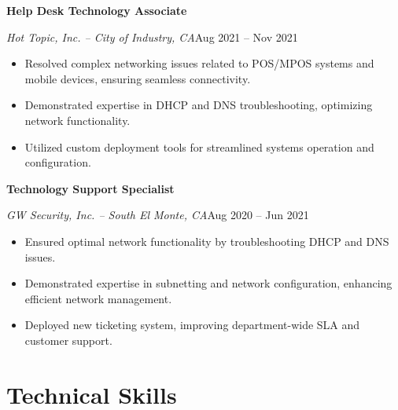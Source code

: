 \documentclass[a4paper]{article}
\begin{document}
\begin{minipage}[t]{0.62\textwidth}
    \vspace{0.5em}
    \textbf{Help Desk Technology Associate}\par
    \textit{Hot Topic, Inc. -- City of Industry, CA}\hfill Aug 2021 -- Nov 2021
    \begin{itemize}[noitemsep,nolistsep]
        \item Resolved complex networking issues related to POS/MPOS systems and mobile devices, ensuring seamless connectivity.
        \item Demonstrated expertise in DHCP and DNS troubleshooting, optimizing network functionality.
        \item Utilized custom deployment tools for streamlined systems operation and configuration.
    \end{itemize}

    \vspace{0.5em}
    \textbf{Technology Support Specialist}\par
    \textit{GW Security, Inc. -- South El Monte, CA}\hfill Aug 2020 -- Jun 2021
    \begin{itemize}[noitemsep,nolistsep]
        \item Ensured optimal network functionality by troubleshooting DHCP and DNS issues.
        \item Demonstrated expertise in subnetting and network configuration, enhancing efficient network management.
        \item Deployed new ticketing system, improving department-wide SLA and customer support.
    \end{itemize}

    \section{Technical Skills}
    \begin{itemize}
        \apptechnicalskills{}
    \end{itemize}
\end{minipage}
\end{document}
